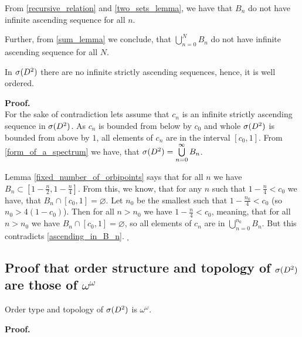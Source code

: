 \begin{observation}\label{ascending_in_B_n}
From \ref{recursive_relation} and \ref{two_sets_lemma}, we have that $B_n$ do not have 
infinite ascending sequence for all $n$. 

Further, from \ref{sum_lemma} we conclude, 
that $\bigcup\limits_{n=0}^N B_n$ do not have infinite ascending sequence for all $N$.
\end{observation}

\begin{theorem}\label{well_order}
In ${{\sigma}(D^2)}$ there are no infinite strictly ascending sequences, hence, it is well ordered.
\end{theorem}
\noindent\textbf{Proof.} \\
For the sake of contradiction lets assume that $c_n$ is an infinite strictly ascending sequence in 
${{\sigma}(D^2)}$. As $c_n$ is bounded from below by $c_0$ and whole ${{\sigma}(D^2)}$ is bounded from above 
by $1$, all elements of $c_n$ are in the interval $[c_0, 1]$. 
From \ref{form_of_a_spectrum} we have, that ${{\sigma}(D^2)} = \bigcup\limits^\infty_{n=0}B_n$. 

Lemma 
\ref{fixed_number_of_orbipoints} says that for all $n$ we
have $B_n \subset [1-\frac{n}{2}, 1 - \frac{n}{4}]$. From this, we know, that for any 
$n$ such that $1 - \frac{n}{4} < c_0$ 
we have, that $B_n \cap [c_0,1] = \varnothing $. Let $n_0$ be the smallest such that 
$1 - \frac{n_0}{4} < c_0$ (so $n_0 > 4(1-c_0)$). 
Then for all $n > n_0$ we have $1 - \frac{n}{4} < c_0$, meaning, that 
for all $n > n_0$ we have
$B_n \cap [c_0,1] = \varnothing $, so all elements of $c_n$ are in 
$\bigcup\limits_{n=0}^{n_0} B_n$.
But this contradicts \ref{ascending_in_B_n}.  $_\square$









\subsection{Proof that order structure and topology of ${{\sigma}(D^2)}$ are those of $\omega^\omega$}
\begin{theorem}\label{speD_order_type}
Order type and topology of ${{\sigma}(D^2)}$ is $\omega^\omega$. 
\end{theorem}
\textbf{Proof.} 

